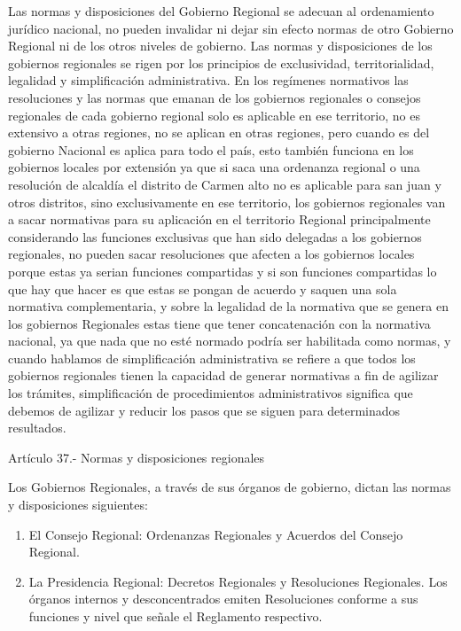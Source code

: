 \documentclass[
  letterpaper,
  DIV=11,
  numbers=noendperiod]{scrartcl}
\providecommand{\tightlist}{%
  \setlength{\itemsep}{0pt}\setlength{\parskip}{0pt}}\usepackage{longtable,booktabs,array}
\begin{document}
Las normas y disposiciones del Gobierno Regional se adecuan al
ordenamiento jurídico nacional, no pueden invalidar ni dejar sin efecto
normas de otro Gobierno Regional ni de los otros niveles de gobierno.
Las normas y disposiciones de los gobiernos regionales se rigen por los
principios de exclusividad, territorialidad, legalidad y simplificación
administrativa. En los regímenes normativos las resoluciones y las
normas que emanan de los gobiernos regionales o consejos regionales de
cada gobierno regional solo es aplicable en ese territorio, no es
extensivo a otras regiones, no se aplican en otras regiones, pero cuando
es del gobierno Nacional es aplica para todo el país, esto también
funciona en los gobiernos locales por extensión ya que si saca una
ordenanza regional o una resolución de alcaldía el distrito de Carmen
alto no es aplicable para san juan y otros distritos, sino
exclusivamente en ese territorio, los gobiernos regionales van a sacar
normativas para su aplicación en el territorio Regional principalmente
considerando las funciones exclusivas que han sido delegadas a los
gobiernos regionales, no pueden sacar resoluciones que afecten a los
gobiernos locales porque estas ya serian funciones compartidas y si son
funciones compartidas lo que hay que hacer es que estas se pongan de
acuerdo y saquen una sola normativa complementaria, y sobre la legalidad
de la normativa que se genera en los gobiernos Regionales estas tiene
que tener concatenación con la normativa nacional, ya que nada que no
esté normado podría ser habilitada como normas, y cuando hablamos de
simplificación administrativa se refiere a que todos los gobiernos
regionales tienen la capacidad de generar normativas a fin de agilizar
los trámites, simplificación de procedimientos administrativos significa
que debemos de agilizar y reducir los pasos que se siguen para
determinados resultados.

Artículo 37.- Normas y disposiciones regionales

Los Gobiernos Regionales, a través de sus órganos de gobierno, dictan
las normas y disposiciones siguientes:

\begin{enumerate}
\def\labelenumi{\alph{enumi})}
\tightlist
\item
  El Consejo Regional: Ordenanzas Regionales y Acuerdos del Consejo
  Regional.
\item
  La Presidencia Regional: Decretos Regionales y Resoluciones
  Regionales. Los órganos internos y desconcentrados emiten Resoluciones
  conforme a sus funciones y nivel que señale el Reglamento respectivo.
\end{enumerate}
\end{document}
